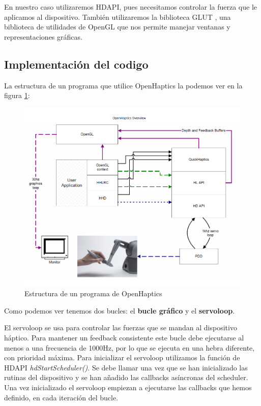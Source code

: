 \documentclass[a4paper,11pt, oneside]{book}
\begin{document}
En nuestro caso utilizaremos HDAPI, pues necesitamos controlar la fuerza que le aplicamos al dispositivo. También utilizaremos la biblioteca GLUT \cite{glut}, una biblioteca de utilidades de OpenGL que nos permite manejar ventanas y representaciones gráficas.

\subsection{Implementación del codigo}

La estructura de un programa que utilice OpenHaptics la podemos ver en la figura \ref{fig:oh-estructura}: 

\begin{figure}[H]
	
	\centering
	\includegraphics[width=\linewidth]{estructura}
	\caption{Estructura de un programa de OpenHaptics}
	\label{fig:oh-estructura}
	
\end{figure}


Como podemos ver tenemos dos bucles: el \textbf{bucle gráfico} y el \textbf{servoloop}.

El servoloop se usa para controlar las fuerzas que se mandan al dispositivo háptico. Para mantener un feedback consistente este bucle debe ejecutarse al menos a una frecuencia de 1000Hz, por lo que se ejecuta en una hebra diferente, con prioridad máxima. Para inicializar el servoloop utilizamos la función de HDAPI \textit{hdStartScheduler()}. Se debe llamar una vez que se han inicializado las rutinas del dispositivo y se han añadido las callbacks asíncronas del scheduler. Una vez inicializado el servoloop empiezan a ejecutarse las callbacks que hemos definido, en cada iteración del bucle.
\end{document}
